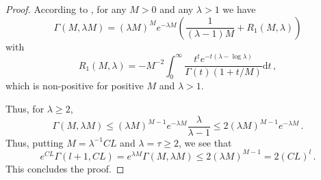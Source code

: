 \documentclass[
	fontsize=11pt, 
	twoside=false, 
	abstract=true, 
	a4paper,
]{scrartcl}
\newcommand{\dd}{\mathrm{d}}
\begin{document}
\begin{proof}
	According to \cite[Thm.~1.1]{zbMATH06619847}, for any $M > 0$ and any $\lambda > 1$ we have
	\[
		\Gamma(M,\lambda M) = (\lambda M)^M e^{-\lambda M} \left(\frac{1}{(\lambda-1)M} + R_1(M,\lambda)\right)
	\]
	with 
	\[
		R_1(M,\lambda) = -M^{-2}\int_0^\infty \frac{t^{t}e^{-t(\lambda -\log \lambda)}}{\Gamma(t)(1+t/M)}\dd t\,,
	\]
	which is non-positive for positive $M$ and $\lambda > 1$.

	Thus, for $\lambda \geq 2$,
	\[
		\Gamma(M,\lambda M) \leq (\lambda M)^{M-1} e^{-\lambda M} \frac{\lambda}{\lambda-1} \leq 2 (\lambda M)^{M-1} e^{-\lambda M}\,.
	\]
	Thus, putting $M = \lambda^{-1}C L$ and $\lambda = \tau \geq 2$, we see that
	\[
		e^{CL}\Gamma\left(l+1, CL\right) = e^{\lambda M}\Gamma(M, \lambda M) \leq 2 (\lambda M)^{M-1} = 2 (CL)^l\,. %
	\]
	This concludes the proof.
\end{proof}
\end{document}
